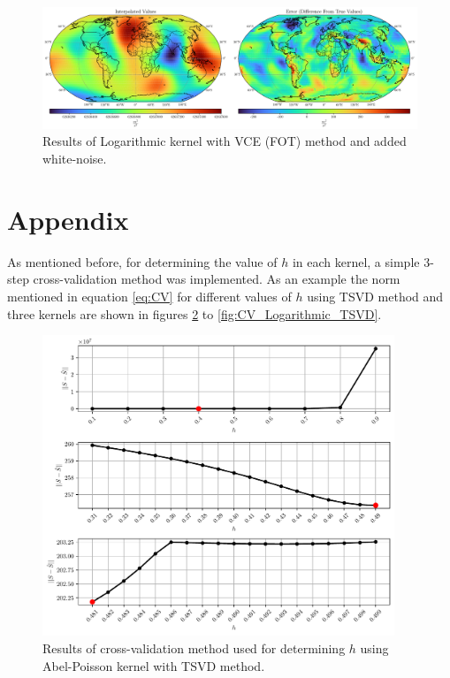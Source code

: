 \documentclass[12pt]{article}
\begin{document}
	\clearpage
	
	\begin{figure}[h!]
		\centering
		\includegraphics[width=16cm]{../Outputs/Plots/Plot_wn_Abel-Poisson_VCE.pdf}
		\caption{Results of Logarithmic kernel with VCE (FOT) method and added white-noise.}
		\label{fig:wn_Abel-Poisson_VCE}
	\end{figure}
	
	\section{Appendix}
	
	As mentioned before, for determining the value of $h$ in each kernel, a simple 3-step cross-validation method was implemented. As an example the norm mentioned in equation \ref{eq:CV} for different values of $h$ using TSVD method and three kernels are shown in figures \ref{fig:CV_Abel-Poisson_TSVD} to \ref{fig:CV_Logarithmic_TSVD}.
	
	\begin{figure}[h!]
		\centering
		\includegraphics[height=9cm]{../Outputs/Plots/CV_Abel-Poisson_TSVD.pdf}
		\caption{Results of cross-validation method used for determining $h$ using Abel-Poisson kernel with TSVD method.}
		\label{fig:CV_Abel-Poisson_TSVD}
	\end{figure}
	
\end{document}
